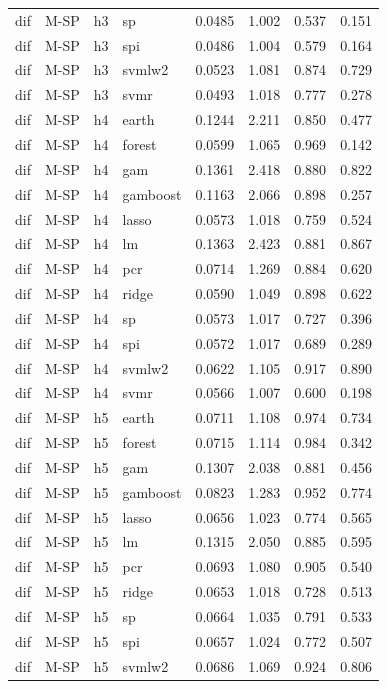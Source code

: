 \begin{ThreePartTable}
\begin{longtable}[t]{llclcccc}
dif & M-SP & h3 & sp & 0.0485 & 1.002 & 0.537 & 0.151\\
dif & M-SP & h3 & spi & 0.0486 & 1.004 & 0.579 & 0.164\\
dif & M-SP & h3 & svmlw2 & 0.0523 & 1.081 & 0.874 & 0.729\\
dif & M-SP & h3 & svmr & 0.0493 & 1.018 & 0.777 & 0.278\\
\addlinespace
dif & M-SP & h4 & earth & 0.1244 & 2.211 & 0.850 & 0.477\\
dif & M-SP & h4 & forest & 0.0599 & 1.065 & 0.969 & 0.142\\
dif & M-SP & h4 & gam & 0.1361 & 2.418 & 0.880 & 0.822\\
dif & M-SP & h4 & gamboost & 0.1163 & 2.066 & 0.898 & 0.257\\
dif & M-SP & h4 & lasso & 0.0573 & 1.018 & 0.759 & 0.524\\
dif & M-SP & h4 & lm & 0.1363 & 2.423 & 0.881 & 0.867\\
dif & M-SP & h4 & pcr & 0.0714 & 1.269 & 0.884 & 0.620\\
dif & M-SP & h4 & ridge & 0.0590 & 1.049 & 0.898 & 0.622\\
dif & M-SP & h4 & sp & 0.0573 & 1.017 & 0.727 & 0.396\\
dif & M-SP & h4 & spi & 0.0572 & 1.017 & 0.689 & 0.289\\
dif & M-SP & h4 & svmlw2 & 0.0622 & 1.105 & 0.917 & 0.890\\
dif & M-SP & h4 & svmr & 0.0566 & 1.007 & 0.600 & 0.198\\
\addlinespace
dif & M-SP & h5 & earth & 0.0711 & 1.108 & 0.974 & 0.734\\
dif & M-SP & h5 & forest & 0.0715 & 1.114 & 0.984 & 0.342\\
dif & M-SP & h5 & gam & 0.1307 & 2.038 & 0.881 & 0.456\\
dif & M-SP & h5 & gamboost & 0.0823 & 1.283 & 0.952 & 0.774\\
dif & M-SP & h5 & lasso & 0.0656 & 1.023 & 0.774 & 0.565\\
dif & M-SP & h5 & lm & 0.1315 & 2.050 & 0.885 & 0.595\\
dif & M-SP & h5 & pcr & 0.0693 & 1.080 & 0.905 & 0.540\\
dif & M-SP & h5 & ridge & 0.0653 & 1.018 & 0.728 & 0.513\\
dif & M-SP & h5 & sp & 0.0664 & 1.035 & 0.791 & 0.533\\
dif & M-SP & h5 & spi & 0.0657 & 1.024 & 0.772 & 0.507\\
dif & M-SP & h5 & svmlw2 & 0.0686 & 1.069 & 0.924 & 0.806\\

\end{longtable}
\end{ThreePartTable}
